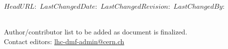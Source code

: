 \svnidlong
{$HeadURL: $}
{$LastChangedDate: $}
{$LastChangedRevision: $}
{$LastChangedBy: $}


\thispagestyle{empty}%
\vspace*{\fill}
\begin{fullwidth}
\sffamily
{
  \Large
  \fontsize{20}{24}\selectfont 
  \smallcaps
  \@title
}\\
\vspace{4\baselineskip}
{\Large 
\noindent
% 
Author/contributor list to be added as document is finalized.\\
Contact editors: \href{mailto:lhc-dmf-admin@cern.ch}{lhc-dmf-admin@cern.ch}
}\\
\vspace{4\baselineskip}
\noindent
\@date\\
\vspace{\baselineskip}
\end{fullwidth}
\vspace*{\fill}
